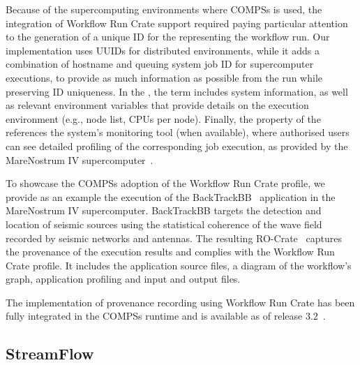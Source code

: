 Because of the supercomputing environments where COMPSs is used, the integration of Workflow Run Crate support required paying particular attention to the generation of a unique ID for the  representing the workflow run. Our implementation uses UUIDs for distributed environments, while it adds a combination of hostname and queuing system job ID for supercomputer executions, to provide as much information as possible from the run while preserving ID uniqueness.
In the , the  term includes system information, as well as relevant environment variables that provide details on the execution environment (e.g., node list, CPUs per node).
Finally, the  property of the  references the system’s monitoring tool (when available),
where authorised users can see detailed profiling of the corresponding job execution, as provided by the MareNostrum IV supercomputer~\cite{marenostrum4-docs}.

To showcase the COMPSs adoption of the Workflow Run Crate profile, we provide as an example the execution of the BackTrackBB~\cite{Poiata 2016}
application in the MareNostrum IV supercomputer.
BackTrackBB targets the detection and location of seismic sources using the statistical coherence of the wave field recorded by seismic networks and antennas.
The resulting RO-Crate~\cite{Poiata 2023} captures the provenance of the execution results and complies with the Workflow Run Crate profile. It includes the application source files, a diagram of the workflow's graph, application profiling and input and output files.

The implementation of provenance recording using Workflow Run Crate has been fully integrated in the COMPSs runtime and is available as of release 3.2~\cite{Ejarque 2023}.


\subsection{StreamFlow}\label{wrroc:streamflow}

